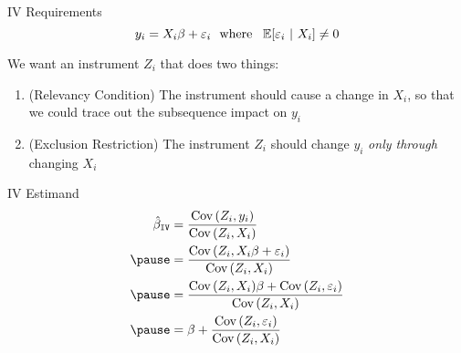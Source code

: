 \documentclass[aspectratio=169,t,11pt,table]{beamer}
\begin{document}
\begin{frame}{IV Requirements}
  \vspace{-\bigskipamount}
  $$
    y_i = X_i \beta + \varepsilon_i \ \text{ where }\ \expec{\varepsilon_i}{X_i} \neq 0
  $$
  
  \bigskip
  We want an instrument $Z_i$ that does two things:
  \begin{enumerate}
    \item {\color{blue} (Relevancy Condition)} The instrument should cause a change in $X_i$, so that we could trace out the subsequence impact on $y_i$ 

    \pause
    \medskip
    \item {\color{raspberry} (Exclusion Restriction)} The instrument $Z_i$ should change $y_i$ \emph{only through} changing $X_i$ 
  \end{enumerate}

\end{frame}

\begin{frame}{IV Estimand}
  \vspace{-\bigskipamount}
  \begin{align*}
    \hat{\beta}_{\texttt{IV}} &= 
    \frac{\cov{Z_i, y_i}}{\cov{Z_i, X_i}} \\
    \pause
    &= \frac{\cov{Z_i, X_i \beta + \varepsilon_i}}{\cov{Z_i, X_i}} \\
    \pause
    &= \frac{\cov{Z_i, X_i} \beta + \cov{Z_i, \varepsilon_i}}{\cov{Z_i, X_i}} \\
    \pause
    &= \beta + \frac{\cov{Z_i, \varepsilon_i}}{\cov{Z_i, X_i}}
  \end{align*}
\end{frame}
\end{document}

